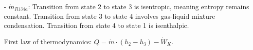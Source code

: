 - \( \dot{m}_{R134a} \):  
  Transition from state 2 to state 3 is isentropic, meaning entropy remains constant.  
  Transition from state 3 to state 4 involves gas-liquid mixture condensation.  
  Transition from state 4 to state 1 is isenthalpic.  

First law of thermodynamics:  
\( Q = \dot{m} \cdot (h_2 - h_3) - \dot{W}_K \).